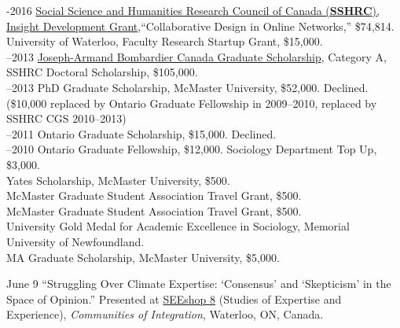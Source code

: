 \documentclass[11pt,usenames,dvipsnames]{article}
\begin{document}

-2016 \href{http://www.sshrc-crsh.gc.ca/funding-financement/programs-programmes/insight_development_grants-su
bventions_de_developpement_savoir-eng.aspx}{Social Science and Humanities Research Council of Canada (\textbf{SSHRC}), Insight Development Grant},``Collaborative Design in Online Networks,'' \$74,814. \\

 University of Waterloo, Faculty Research Startup Grant, \$15,000. \\

–2013 \href{http://www.sshrc-crsh.gc.ca/funding-financement/programs-programmes/fellowships/doctoral-doctorat-eng.aspx}{Joseph-Armand Bombardier Canada Graduate Scholarship}, Category A, SSHRC Doctoral Scholarship, \$105,000.\\

–2013 PhD Graduate Scholarship, McMaster University, \$52,000. Declined. (\$10,000 replaced by Ontario Graduate Fellowship in 2009–2010, replaced by SSHRC CGS 2010–2013)\\

–2011 Ontario Graduate Scholarship, \$15,000. Declined.\\

–2010 Ontario Graduate Fellowship, \$12,000. Sociology Department Top Up, \$3,000.\\

 Yates Scholarship, McMaster University, \$500.\\

 McMaster Graduate Student Association Travel Grant, \$500.\\

 McMaster Graduate Student Association Travel Grant, \$500.\\

 University Gold Medal for Academic Excellence in Sociology, Memorial University of Newfoundland.\\

 MA Graduate Scholarship, McMaster University, \$5,000.\\
 

\ind June 9 ``Struggling Over Climate Expertise: `Consensus' and `Skepticism' in the Space of Opinion.'' Presented at \href{http://www.cf.ac.uk/socsi/contactsandpeople/harrycollins/expertise-project/seeshophome.html}{SEEshop 8} (Studies of Expertise and Experience), \emph{Communities of Integration}, Waterloo, ON, Canada. \\
\end{document}
